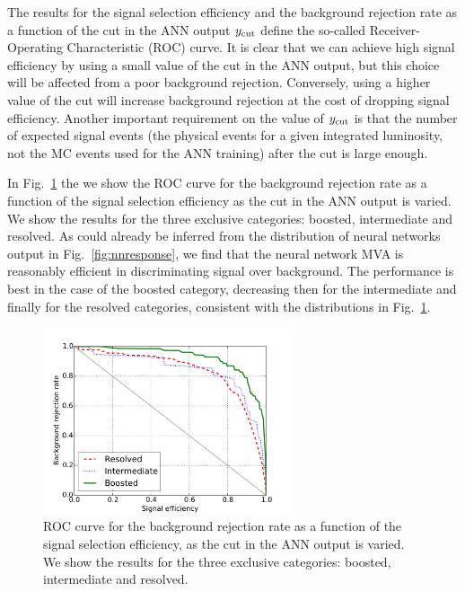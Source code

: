 The results for the signal selection efficiency and the 
background rejection rate as a function of the cut in the ANN output
$y_{\rm cut}$
define the so-called  Receiver-Operating Characteristic (ROC)
curve.
%
It is clear that we can achieve  high signal efficiency by using
a small value of the cut in the ANN output, but this choice will be
affected from a poor background
rejection.
%
Conversely, using a higher value of the cut will increase background rejection at the
cost of dropping signal efficiency.
%
Another important requirement on the value of $y_{\rm cut}$ is that
the  number of expected  signal events (the physical
events for a given integrated
luminosity, not the MC events used for the ANN training)
after the cut is large enough.

In Fig.~\ref{fig:exampleroc} the
we show the ROC curve for the background rejection rate as a function of the signal
  selection efficiency as the cut in the ANN output is varied.
  We show the results for the three exclusive categories: boosted, intermediate
  and resolved.
%
As could already be inferred from the distribution of neural
networks output in Fig.~\ref{fig:nnresponse}, we find
that the neural network MVA is reasonably efficient
in discriminating signal over background.
%
The performance is best in the case of the boosted category,
decreasing then for the intermediate and finally for the
resolved categories, consistent with the distributions in
Fig.~\ref{fig:exampleroc}.
%

\begin{figure}[t]
\begin{center}
\includegraphics[width=0.65\textwidth]{plots/roc.pdf}
\caption{\small ROC curve for the background rejection rate as a function of the signal
  selection efficiency, as the cut in the ANN output is varied.
  We show the results for the three exclusive categories: boosted, intermediate
  and resolved.
}
\label{fig:exampleroc}
\end{center}
\end{figure}

